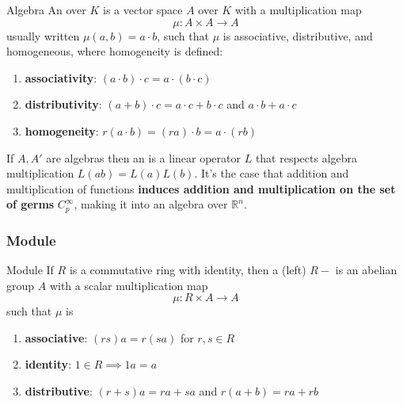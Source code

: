 \begin{definition}{Algebra}{}
    An  over  \(K\) is a vector space \(A\) over \(K\) with a multiplication map
    \begin{equation}
        \mu\colon A \times A \rightarrow A
    \end{equation}
    usually written \(\mu(a,b)=a \cdot b\), such that \(\mu\) is associative, distributive, and homogeneous, where homogeneity is defined:
    \begin{enumerate}
        \item \textbf{associativity}: \((a\cdot b)\cdot c = a \cdot (b \cdot c) \)
        \item \textbf{distributivity}: \((a+b)\cdot c = a\cdot c + b \cdot c\) and \(a\cdot b + a \cdot c\)
        \item \textbf{homogeneity}: \(r(a\cdot b) = (ra)\cdot b = a\cdot (rb)\)
    \end{enumerate}
\end{definition}

If \(A, A'\) are algebras then an  is a linear operator \(L\) that respects algebra multiplication \(L(ab) = L(a)L(b)\).
%
It's the case that addition and multiplication of functions \textbf{induces addition and multiplication on the set of germs} \(C_p^\infty\), making it into an algebra over \(\mathbb{R}^n\).

\subsubsection{Module}

\begin{definition}{Module}{}
    If \(R\) is a commutative ring with identity, then a (left) \(R-\) is an abelian group \(A\) with a scalar multiplication map
    \begin{equation}
        \mu \colon R\times A \rightarrow A
    \end{equation}
    such that \(\mu\) is
    \begin{enumerate}
        \item \textbf{associative}: \((rs)a = r (sa)\) for \(r,s \in R\)
        \item \textbf{identity}: \(1 \in R \implies 1a=a\)
        \item \textbf{distributive}: \((r+s)a = ra + sa\) and \(r(a+b) = ra + rb\)
    \end{enumerate}
\end{definition}

